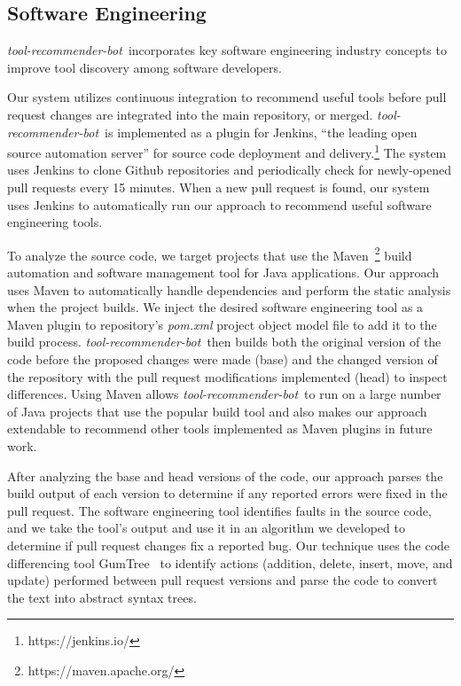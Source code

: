 \documentclass[conference]{IEEEtran}
\newcommand{\tool}{\textsl{tool-recommender-bot}}
\newcommand{\pseudosubsection}[1]{\vspace{2mm} \noindent{\it #1}}
\begin{document}
\subsection{Software Engineering}

\tool~incorporates key software engineering industry concepts to improve tool discovery among software developers.

\pseudosubsection{Continuous Integration}

Our system utilizes continuous integration to recommend useful tools before pull request changes are integrated into the main repository, or merged. \tool~is implemented as a plugin for Jenkins, ``the leading open source automation server'' for source code deployment and delivery.\footnote{https://jenkins.io/} The system uses Jenkins to clone Github repositories and periodically check for newly-opened pull requests every 15 minutes. When a new pull request is found, our system uses Jenkins to automatically run our approach to recommend useful software engineering tools.

To analyze the source code, we target projects that use the Maven~\footnote{https://maven.apache.org/} build automation and software management tool for Java applications. Our approach uses Maven to automatically handle dependencies and perform the static analysis when the project builds. We inject the desired software engineering tool as a Maven plugin to repository's \textit{pom.xml} project object model file to add it to the build process. \tool~then builds both the original version of the code before the proposed changes were made (base) and the changed version of the repository with the pull request modifications implemented (head) to inspect differences. Using Maven allows \tool~to run on a large number of Java projects that use the popular build tool and also makes our approach extendable to recommend other tools implemented as Maven plugins in future work. 

\pseudosubsection{Fix Identification}

After analyzing the base and head versions of the code, our approach parses the build output of each version to determine if any reported errors were fixed in the pull request. The software engineering tool identifies faults in the source code, and we take the tool's output and use it in an algorithm we developed to determine if pull request changes fix a reported bug. Our technique uses the code differencing tool GumTree~\cite{GumTree} to identify actions (addition, delete, insert, move, and update) performed between pull request versions and parse the code to convert the text into abstract syntax trees. 
\end{document}
